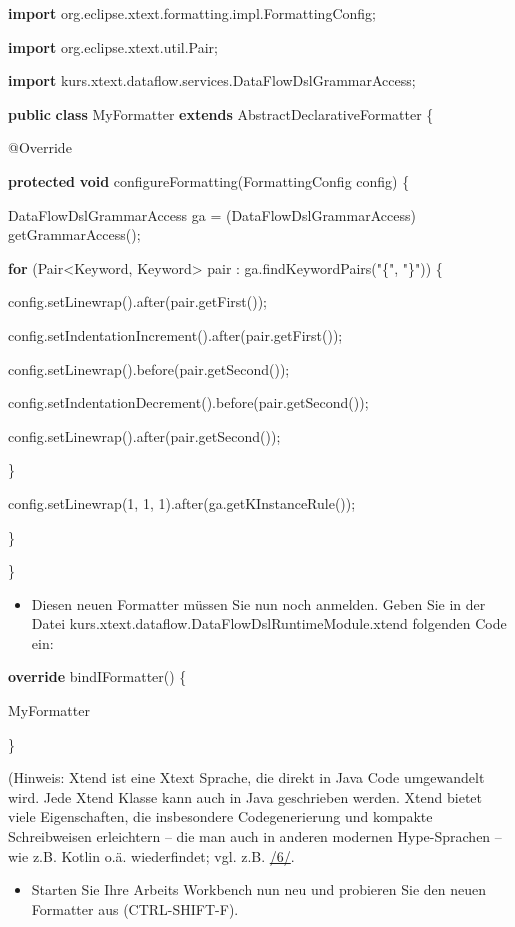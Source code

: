 \documentclass[]{article}
\providecommand{\tightlist}{%
  \setlength{\itemsep}{0pt}\setlength{\parskip}{0pt}}
\begin{document}
\textbf{import} org.eclipse.xtext.formatting.impl.FormattingConfig;

\textbf{import} org.eclipse.xtext.util.Pair;

\textbf{import} kurs.xtext.dataflow.services.DataFlowDslGrammarAccess;

\textbf{public} \textbf{class} MyFormatter \textbf{extends}
AbstractDeclarativeFormatter \{

@Override

\textbf{protected} \textbf{void} configureFormatting(FormattingConfig
config) \{

DataFlowDslGrammarAccess ga = (DataFlowDslGrammarAccess)
getGrammarAccess();

\textbf{for} (Pair\textless{}Keyword, Keyword\textgreater{} pair :
ga.findKeywordPairs("\{", "\}")) \{

config.setLinewrap().after(pair.getFirst());

config.setIndentationIncrement().after(pair.getFirst());

config.setLinewrap().before(pair.getSecond());

config.setIndentationDecrement().before(pair.getSecond());

config.setLinewrap().after(pair.getSecond());

\}

config.setLinewrap(1, 1, 1).after(ga.getKInstanceRule());

\}

\}

\begin{itemize}
\tightlist
\item
  Diesen neuen Formatter müssen Sie nun noch anmelden. Geben Sie in der
  Datei kurs.xtext.dataflow.DataFlowDslRuntimeModule.xtend folgenden
  Code ein:
\end{itemize}

\textbf{override} bindIFormatter() \{

MyFormatter

\}

(Hinweis: Xtend ist eine Xtext Sprache, die direkt in Java Code
umgewandelt wird. Jede Xtend Klasse kann auch in Java geschrieben
werden. Xtend bietet viele Eigenschaften, die insbesondere
Codegenerierung und kompakte Schreibweisen erleichtern -- die man auch
in anderen modernen Hype-Sprachen -- wie z.B. Kotlin o.ä. wiederfindet;
vgl. z.B. \protect\hyperlink{anchor-11}{/6/}.

\begin{itemize}
\tightlist
\item
  Starten Sie Ihre Arbeits Workbench nun neu und probieren Sie den neuen
  Formatter aus (CTRL-SHIFT-F).
\end{itemize}
\end{document}
